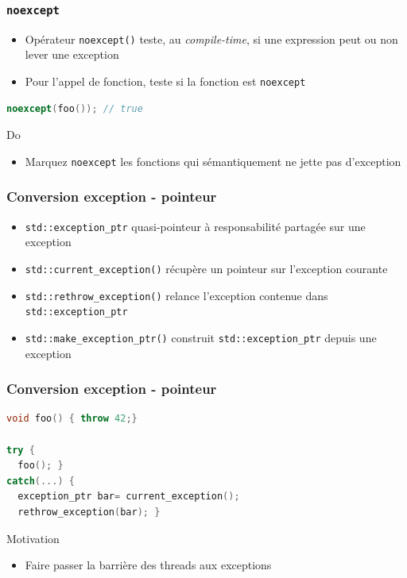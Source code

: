 \documentclass[C++.tex]{subfiles}
\begin{document}
\begin{frame}[fragile]
	\frametitle{\lstinline|noexcept|}
	\begin{itemize}
		\item Opérateur \lstinline|noexcept()| teste, au \textit{compile-time}, si une expression peut ou non lever une exception
		\item Pour l'appel de fonction, teste si la fonction est \lstinline|noexcept|

	\end{itemize}

	\begin{lstlisting}[language=C++]
noexcept(foo()); // true\end{lstlisting}

	\begin{exampleblock}{Do}
		\begin{itemize}
			\item Marquez \lstinline|noexcept| les fonctions qui sémantiquement ne jette pas d'exception
		\end{itemize}
	\end{exampleblock}
\end{frame}

\begin{frame}[fragile]
	\frametitle{Conversion exception - pointeur}
	\begin{itemize}
		\item \lstinline|std::exception_ptr| quasi-pointeur à responsabilité partagée sur une exception
		\item \lstinline|std::current_exception()| récupère un pointeur sur l'exception courante
		\item \lstinline|std::rethrow_exception()| relance l'exception contenue dans \lstinline|std::exception_ptr| 
		\item \lstinline|std::make_exception_ptr()| construit \lstinline|std::exception_ptr| depuis une exception
	\end{itemize}
\end{frame}

\begin{frame}[fragile]
	\frametitle{Conversion exception - pointeur}
	\begin{lstlisting}[language=C++]
void foo() { throw 42;}

try {
  foo(); }
catch(...) {
  exception_ptr bar= current_exception();
  rethrow_exception(bar); } \end{lstlisting}

	\begin{block}{Motivation}
		\begin{itemize}
			\item Faire passer la barrière des threads aux exceptions
		\end{itemize}
	\end{block}
\end{frame}
\end{document}
